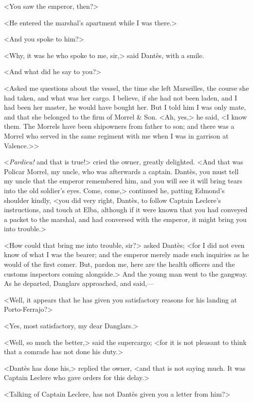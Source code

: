  <You saw the emperor, then?> 

 <He entered the marshal's apartment while I was there.> 

 <And you spoke to him?> 

 <Why, it was he who spoke to me, sir,> said Dantès, with a smile. 

 <And what did he say to you?> 

 <Asked me questions about the vessel, the time she left Marseilles, the course she had taken, and what was her cargo. I believe, if she had not been laden, and I had been her master, he would have bought her. But I told him I was only mate, and that she belonged to the firm of Morrel \& Son. <Ah, yes,> he said, <I know them. The Morrels have been shipowners from father to son; and there was a Morrel who served in the same regiment with me when I was in garrison at Valence.>> 

 <\textit{Pardieu!} and that is true!> cried the owner, greatly delighted. <And that was Policar Morrel, my uncle, who was afterwards a captain. Dantès, you must tell my uncle that the emperor remembered him, and you will see it will bring tears into the old soldier's eyes. Come, come,> continued he, patting Edmond's shoulder kindly, <you did very right, Dantès, to follow Captain Leclere's instructions, and touch at Elba, although if it were known that you had conveyed a packet to the marshal, and had conversed with the emperor, it might bring you into trouble.>  
 
 <How could that bring me into trouble, sir?> asked Dantès; <for I did not even know of what I was the bearer; and the emperor merely made such inquiries as he would of the first comer. But, pardon me, here are the health officers and the customs inspectors coming alongside.> And the young man went to the gangway. As he departed, Danglars approached, and said,— 

 <Well, it appears that he has given you satisfactory reasons for his landing at Porto-Ferrajo?> 

 <Yes, most satisfactory, my dear Danglars.> 

 <Well, so much the better,> said the supercargo; <for it is not pleasant to think that a comrade has not done his duty.> 

 <Dantès has done his,> replied the owner, <and that is not saying much. It was Captain Leclere who gave orders for this delay.> 

 <Talking of Captain Leclere, has not Dantès given you a letter from him?> 

